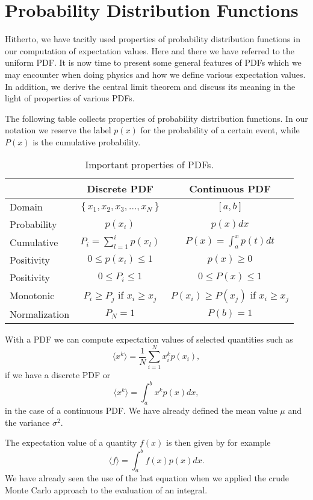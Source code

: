 \section{Probability Distribution Functions}


Hitherto, we have tacitly used properties of probability distribution
functions in our computation of expectation values. Here and there we have 
referred to the uniform PDF. It is now time to present some general
features of PDFs which we may encounter when doing physics and how we define
various expectation values. In addition, we derive the central limit theorem and
discuss its meaning in the light of properties of various PDFs.

The following table collects properties of probability distribution functions.
In our notation we reserve the label $p(x)$ for the probability of a certain event,
while $P(x)$ is the cumulative probability. 

\begin{table}[hbtp]
\begin{center}
\caption{Important properties of PDFs.}
\begin{tabular}{lcc}\hline
   & Discrete PDF& Continuous PDF\\\hline
Domain & $\left\{x_1, x_2, x_3, \dots, x_N\right\}$ & $[a,b]$ \\
Probability & $p(x_i)$ &  $p(x)dx$ \\
Cumulative  & $P_i=\sum_{l=1}^ip(x_l)$ & $P(x)=\int_a^xp(t)dt$ \\
Positivity  & $ 0 \le p(x_i) \le 1$ & $ p(x) \ge 0$ \\
Positivity  & $ 0 \le P_i \le 1$ & $ 0 \le P(x) \le 1$ \\
Monotonic    & $P_i \ge P_j$ if $x_i \ge x_j$ & $P(x_i) \ge P(x_j)$ if $x_i \ge x_j$ \\
Normalization & $P_N=1$ & $P(b)=1$\\ 
\hline
\end{tabular} 
\end{center}   
\end{table}     

With a PDF we can compute expectation values of selected quantities such as
\[
    \langle x^k\rangle=\frac{1}{N}\sum_{i=1}^{N}x_i^kp(x_i),
\]
if we have a discrete PDF or 
\[
    \langle x^k\rangle=\int_a^b x^kp(x)dx,
\]
in the case of a continuous PDF. We have already defined the mean value $\mu$
and the variance $\sigma^2$. 

The expectation value of a quantity $f(x)$ is then given by for example
\[
    \langle f\rangle=\int_a^bf(x)p(x)dx.
\]
We have already seen the use of the last equation when we applied the 
crude Monte Carlo approach to the evaluation of an integral. 

